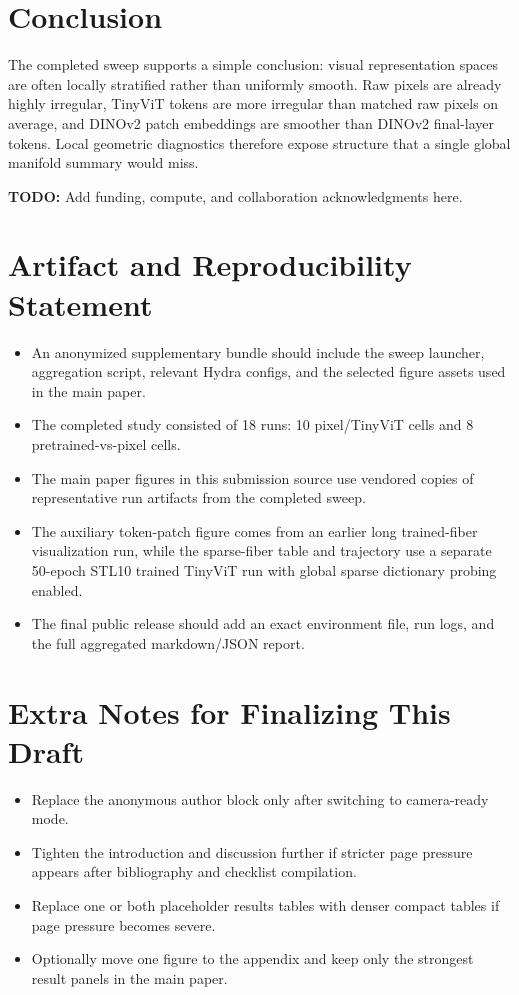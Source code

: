 \documentclass{article}
\newcommand{\TODO}[1]{\textcolor{red!70!black}{\textbf{TODO:} #1}}
\newcommand{\dataset}[1]{\textsc{#1}}
\begin{document}
\section{Conclusion}
The completed sweep supports a simple conclusion: visual representation spaces are often locally stratified rather than uniformly smooth. Raw pixels are already highly irregular, TinyViT tokens are more irregular than matched raw pixels on average, and DINOv2 patch embeddings are smoother than DINOv2 final-layer tokens. Local geometric diagnostics therefore expose structure that a single global manifold summary would miss.

\begin{ack}
\TODO{Add funding, compute, and collaboration acknowledgments here.}
\end{ack}




\appendix

\section{Artifact and Reproducibility Statement}
\begin{itemize}[leftmargin=1.5em]
\item An anonymized supplementary bundle should include the sweep launcher, aggregation script, relevant Hydra configs, and the selected figure assets used in the main paper.
\item The completed study consisted of 18 runs: 10 pixel/TinyViT cells and 8 pretrained-vs-pixel cells.
\item The main paper figures in this submission source use vendored copies of representative run artifacts from the completed sweep.
\item The auxiliary token-patch figure comes from an earlier long trained-fiber visualization run, while the sparse-fiber table and trajectory use a separate 50-epoch \dataset{STL10} trained TinyViT run with global sparse dictionary probing enabled.
\item The final public release should add an exact environment file, run logs, and the full aggregated markdown/JSON report.
\end{itemize}

\section{Extra Notes for Finalizing This Draft}
\begin{itemize}[leftmargin=1.5em]
\item Replace the anonymous author block only after switching to camera-ready mode.
\item Tighten the introduction and discussion further if stricter page pressure appears after bibliography and checklist compilation.
\item Replace one or both placeholder results tables with denser compact tables if page pressure becomes severe.
\item Optionally move one figure to the appendix and keep only the strongest result panels in the main paper.
\end{itemize}


\end{document}
